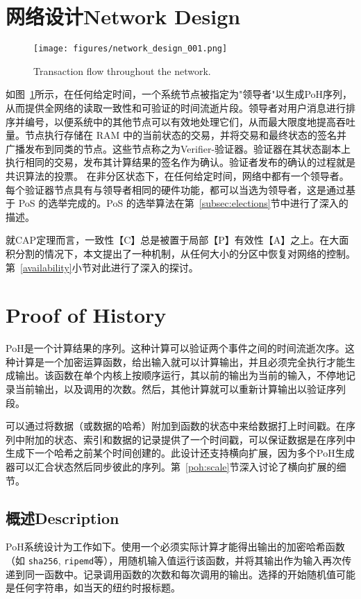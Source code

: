 \documentclass[12pt, uft8]{ctexart}
\begin{document}
\section{网络设计Network Design}\label{design}

\begin{figure}[h]
  \begin{center}
    \centering
    \texttt{[image: figures/network\_design\_001.png]}
    \caption[Fig 1]{Transaction flow throughout the network.\label{fig:design}}
  \end{center}
  \end{figure}

如图~\ref{fig:design}所示，在任何给定时间，一个系统节点被指定为"领导者"以生成PoH序列，从而提供全网络的读取一致性和可验证的时间流逝片段。领导者对用户消息进行排序并编号，以便系统中的其他节点可以有效地处理它们，从而最大限度地提高吞吐量。节点执行存储在 RAM 中的当前状态的交易，并将交易和最终状态的签名并广播发布到同类的节点。这些节点称之为Verifier-验证器。验证器在其状态副本上执行相同的交易，发布其计算结果的签名作为确认。验证者发布的确认的过程就是共识算法的投票。
在非分区状态下，在任何给定时间，网络中都有一个领导者。每个验证器节点具有与领导者相同的硬件功能，都可以当选为领导者，这是通过基于 PoS 的选举完成的。PoS 的选举算法在第~\ref{subsec:elections}节中进行了深入的描述。

就CAP定理而言，一致性【C】总是被置于局部【P】有效性【A】之上。在大面积分割的情况下，本文提出了一种机制，从任何大小的分区中恢复对网络的控制。第~\ref{availability}小节对此进行了深入的探讨。

\section{Proof of History}\label{proof_of_history}

PoH是一个计算结果的序列。这种计算可以验证两个事件之间的时间流逝次序。这种计算是一个加密运算函数，给出输入就可以计算输出，并且必须完全执行才能生成输出。该函数在单个内核上按顺序运行，其以前的输出为当前的输入，不停地记录当前输出，以及调用的次数。然后，其他计算就可以重新计算输出以验证序列段。

可以通过将数据（或数据的哈希）附加到函数的状态中来给数据打上时间戳。在序列中附加的状态、索引和数据的记录提供了一个时间戳，可以保证数据是在序列中生成下一个哈希之前某个时间创建的。此设计还支持横向扩展，因为多个PoH生成器可以汇合状态然后同步彼此的序列。第~\ref{poh:scale}节深入讨论了横向扩展的细节。\\

\subsection{概述Description}
PoH系统设计为工作如下。使用一个必须实际计算才能得出输出的加密哈希函数（如 \texttt{sha256}, \texttt{ripemd}等），用随机输入值运行该函数，并将其输出作为输入再次传递到同一函数中。记录调用函数的次数和每次调用的输出。选择的开始随机值可能是任何字符串，如当天的纽约时报标题。
\end{document}
